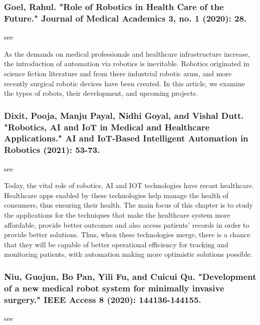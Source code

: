 \documentclass[conference]{IEEEtran}
\begin{document}
\medskip
\subsubsection{Goel, Rahul. "Role of Robotics in Health Care of the Future." Journal of Medical Academics 3, no. 1 (2020): 28.}
see \cite{goel2020role}

As the demands on medical professionals and healthcare infrastructure increase, the introduction of automation via robotics is inevitable.
Robotics originated in science fiction literature and from there industrial robotic arms, and more recently surgical robotic devices have been
created. In this article, we examine the types of robots, their development, and upcoming projects.

\medskip
\subsubsection{Dixit, Pooja, Manju Payal, Nidhi Goyal, and Vishal Dutt. "Robotics, AI and IoT in Medical and Healthcare Applications." AI and IoT‐Based Intelligent Automation in Robotics (2021): 53-73.}
see \cite{dixit2021robotics}

Today, the vital role of robotics, AI and IOT technologies have recast healthcare. Healthcare apps enabled by these technologies help manage the health of consumers, thus ensuring their health. The main focus of this chapter is to study the applications for the techniques that make the healthcare system more affordable, provide better outcomes and also access patients' records in order to provide better solutions. Thus, when these technologies merge, there is a chance that they will be capable of better operational efficiency for tracking and monitoring patients, with automation making more optimistic solutions possible.

\medskip
\subsubsection{Niu, Guojun, Bo Pan, Yili Fu, and Cuicui Qu. "Development of a new medical robot system for minimally invasive surgery." IEEE Access 8 (2020): 144136-144155.}
see \cite{niu2020development}
\end{document}
